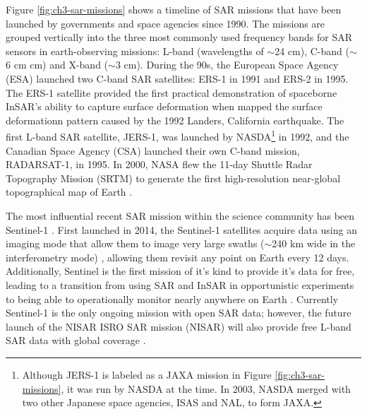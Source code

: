 Figure \ref{fig:ch3-sar-missions} shows a timeline of SAR missions that have been launched by governments and space agencies since 1990. The missions are grouped vertically into the three most commonly used frequency bands for SAR sensors in earth-observing missions: L-band (wavelengths of $\sim$24 cm), C-band ($\sim$6 cm cm) and X-band ($\sim$3 cm).
During the 90s, the European Space Agency (ESA) launched two C-band SAR satellites: ERS-1 in 1991 and ERS-2 in 1995. The ERS-1 satellite provided the first practical demonstration of spaceborne InSAR's ability to capture surface deformation
when \cite{Massonnet1993DisplacementFieldLanders} mapped the  surface deformationn pattern caused by the 1992 Landers, California earthquake. The first L-band SAR satellite, JERS-1, was launched by NASDA\footnote{Although JERS-1 is labeled as a JAXA mission in Figure \ref{fig:ch3-sar-missions}, it was run by NASDA at the time. In 2003, NASDA merged with two other Japanese space agencies, ISAS and NAL, to form JAXA.} in 1992, and the Canadian Space Agency (CSA) launched their own C-band mission, RADARSAT-1, in 1995. In 2000, NASA flew the 11-day Shuttle Radar Topography Mission (SRTM) to generate the first high-resolution near-global topographical map of Earth \citep{Farr2007ShuttleRadarTopography}.

The most influential recent SAR mission within the science community has been Sentinel-1 \citep{Torres2012GmesSentinel1}. First launched in 2014, the Sentinel-1 satellites acquire data using an imaging mode that allow them to image very large swaths ($\sim$240 km wide in the interferometry mode) \cite{Zan2006TopsarTerrainObservation}, allowing them revisit any point on Earth every 12 days. 
Additionally, Sentinel is the first mission of it's kind to provide it's data for free, leading to a transition from using SAR and InSAR in opportunistic experiments to being able to operationally monitor nearly anywhere on Earth  \cite{Rosen2021ShiftingGround}.
Currently Sentinel-1 is the only ongoing mission with open SAR data; however, the future launch of the NISAR ISRO SAR mission (NISAR) will also provide free L-band SAR data with global coverage \citep{Rosen2015NasaIsroSar}.


